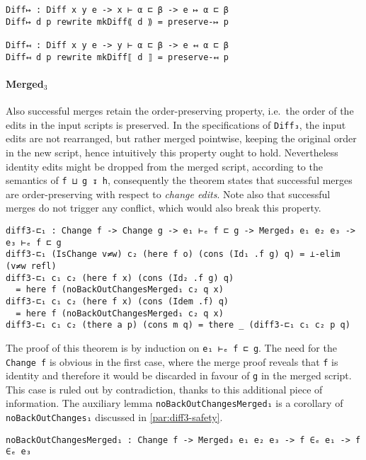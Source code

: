 \documentclass[../Thesis.tex]{subfiles}
\begin{document}
\begin{verbatim}
Diff↦ : Diff x y e -> x ⊢ α ⊏ β -> e ↦ α ⊏ β
Diff↦ d p rewrite mkDiff⟪ d ⟫ = preserve-↦ p

Diff↤ : Diff x y e -> y ⊢ α ⊏ β -> e ↤ α ⊏ β
Diff↤ d p rewrite mkDiff⟦ d ⟧ = preserve-↤ p
\end{verbatim}

	\paragraph{Merged$_3$}
	Also successful merges retain the order-preserving property, i.e.\
	the order of the edits in the input scripts is preserved.
	In the specifications of \texttt{Diff₃}, the input edits are not rearranged, 
	but rather merged pointwise, keeping the original order in the new script,
	hence intuitively this property ought to hold.
	Nevertheless identity edits might be dropped from the merged script, 
	according to the semantics of \texttt{f ⊔ g ↧ h},
	consequently the theorem states that successful merges are 
	order-preserving with respect to \emph{change edits}.
	Note also that successful merges do not trigger any conflict, which
	would also break this property.
	
\begin{verbatim}
diff3-⊏₁ : Change f -> Change g -> e₁ ⊢ₑ f ⊏ g -> Merged₃ e₁ e₂ e₃ -> e₃ ⊢ₑ f ⊏ g
diff3-⊏₁ (IsChange v≠w) c₂ (here f o) (cons (Id₁ .f g) q) = ⊥-elim (v≠w refl)
diff3-⊏₁ c₁ c₂ (here f x) (cons (Id₂ .f g) q) 
  = here f (noBackOutChangesMerged₁ c₂ q x)
diff3-⊏₁ c₁ c₂ (here f x) (cons (Idem .f) q) 
  = here f (noBackOutChangesMerged₁ c₂ q x)
diff3-⊏₁ c₁ c₂ (there a p) (cons m q) = there _ (diff3-⊏₁ c₁ c₂ p q)
\end{verbatim}
  
	The proof of this theorem is by induction on \texttt{e₁ ⊢ₑ f ⊏ g}.
	The need for the \texttt{Change f} is obvious in the first case, where
	the merge proof reveals that \texttt{f} is identity and therefore it would be 
	discarded	in favour of \texttt{g} in the merged script.
	This case is ruled out by contradiction, thanks to this additional piece
	of information.
	The auxiliary lemma \texttt{noBackOutChangesMerged₁} is a corollary 
	of \texttt{noBackOutChanges₁} discussed in \ref{par:diff3-safety}.
		
\begin{verbatim}
noBackOutChangesMerged₁ : Change f -> Merged₃ e₁ e₂ e₃ -> f ∈ₑ e₁ -> f ∈ₑ e₃
\end{verbatim}
	
\end{document}
